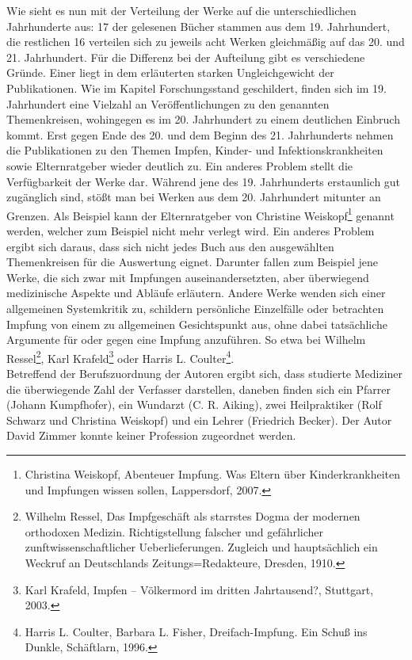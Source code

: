 \documentclass[
    a4paper,
    12pt,
    hyphens,
    chapterprefix=true,
    headheight=33pt,
    footheight=29pt,
    headings=optiontohead, %
]{scrartcl}
\begin{document}
Wie sieht es nun mit der Verteilung der Werke auf die unterschiedlichen Jahrhunderte aus: 17 der gelesenen Bücher stammen aus dem 19. Jahrhundert, die restlichen 16 verteilen sich zu jeweils acht Werken gleichmäßig auf das 20. und 21. Jahrhundert. Für die Differenz bei der Aufteilung gibt es verschiedene Gründe. Einer liegt in dem erläuterten starken Ungleichgewicht der Publikationen. Wie im Kapitel Forschungsstand geschildert, finden sich im 19. Jahrhundert eine Vielzahl an Veröffentlichungen zu den genannten Themenkreisen, wohingegen es im 20. Jahrhundert zu einem deutlichen Einbruch kommt. Erst gegen Ende des 20. und dem Beginn des 21. Jahrhunderts nehmen die Publikationen zu den Themen Impfen, Kinder- und Infektionskrankheiten sowie Elternratgeber wieder deutlich zu. Ein anderes Problem stellt die Verfügbarkeit der Werke dar. Während jene des 19. Jahrhunderts erstaunlich gut zugänglich sind, stößt man bei Werken aus dem 20. Jahrhundert mitunter an Grenzen. Als Beispiel kann der Elternratgeber von Christine Weiskopf\footnote{Christina Weiskopf, Abenteuer Impfung. Was Eltern über Kinderkrankheiten und Impfungen wissen sollen, Lappersdorf, 2007.} genannt werden, welcher zum Beispiel nicht mehr verlegt wird. Ein anderes Problem ergibt sich daraus, dass sich nicht jedes Buch aus den ausgewählten Themenkreisen für die Auswertung eignet. Darunter fallen zum Beispiel jene Werke, die sich zwar mit Impfungen auseinandersetzten, aber überwiegend medizinische Aspekte und Abläufe erläutern. Andere Werke wenden sich einer allgemeinen Systemkritik zu, schildern persönliche Einzelfälle oder betrachten Impfung von einem zu allgemeinen Gesichtspunkt aus, ohne dabei tatsächliche Argumente für oder gegen eine Impfung anzuführen. So etwa bei Wilhelm Ressel\footnote{Wilhelm Ressel, Das Impfgeschäft als starrstes Dogma der modernen orthodoxen Medizin. Richtigstellung falscher und gefährlicher zunftwissenschaftlicher Ueberlieferungen. Zugleich und hauptsächlich ein Weckruf an Deutschlands Zeitungs=Redakteure, Dresden, 1910.}, Karl Krafeld\footnote{Karl Krafeld, Impfen -- Völkermord im dritten Jahrtausend?, Stuttgart, 2003.} oder Harris L. Coulter\footnote{Harris L. Coulter, Barbara L. Fisher, Dreifach-Impfung. Ein Schuß ins Dunkle, Schäftlarn, 1996.}.\\
Betreffend der Berufszuordnung der Autoren ergibt sich, dass studierte Mediziner die überwiegende Zahl der Verfasser darstellen, daneben finden sich ein Pfarrer (Johann Kumpfhofer), ein Wundarzt (C. R. Aiking), zwei Heilpraktiker (Rolf Schwarz und Christina Weiskopf) und ein Lehrer (Friedrich Becker). Der Autor David Zimmer konnte keiner Profession zugeordnet werden.
\end{document}
